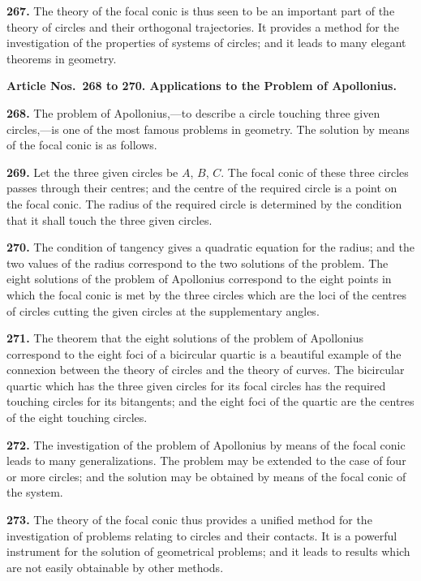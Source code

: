 \documentclass[12pt,a4paper]{article}
\theoremstyle{definition}
\begin{document}
\noindent\textbf{267.} The theory of the focal conic is thus seen to be an important part of the
theory of circles and their orthogonal trajectories. It provides a method for the
investigation of the properties of systems of circles; and it leads to many elegant
theorems in geometry.

\vspace{0.5em}
\noindent\textbf{Article Nos.~268 to 270. Applications to the Problem of Apollonius.}

\vspace{0.3em}
\noindent\textbf{268.} The problem of Apollonius,---to describe a circle touching three given
circles,---is one of the most famous problems in geometry. The solution by means of
the focal conic is as follows.

\noindent\textbf{269.} Let the three given circles be $A$, $B$, $C$. The focal conic of these three
circles passes through their centres; and the centre of the required circle is a point on
the focal conic. The radius of the required circle is determined by the condition that
it shall touch the three given circles.

\noindent\textbf{270.} The condition of tangency gives a quadratic equation for the radius; and
the two values of the radius correspond to the two solutions of the problem. The
eight solutions of the problem of Apollonius correspond to the eight points in which
the focal conic is met by the three circles which are the loci of the centres of circles
cutting the given circles at the supplementary angles.

\newpage
\noindent\textbf{271.} The theorem that the eight solutions of the problem of Apollonius
correspond to the eight foci of a bicircular quartic is a beautiful example of the
connexion between the theory of circles and the theory of curves. The bicircular
quartic which has the three given circles for its focal circles has the required touching
circles for its bitangents; and the eight foci of the quartic are the centres of the eight
touching circles.

\noindent\textbf{272.} The investigation of the problem of Apollonius by means of the focal
conic leads to many generalizations. The problem may be extended to the case of
four or more circles; and the solution may be obtained by means of the focal conic
of the system.

\noindent\textbf{273.} The theory of the focal conic thus provides a unified method for the
investigation of problems relating to circles and their contacts. It is a powerful
instrument for the solution of geometrical problems; and it leads to results which are
not easily obtainable by other methods.
\end{document}
